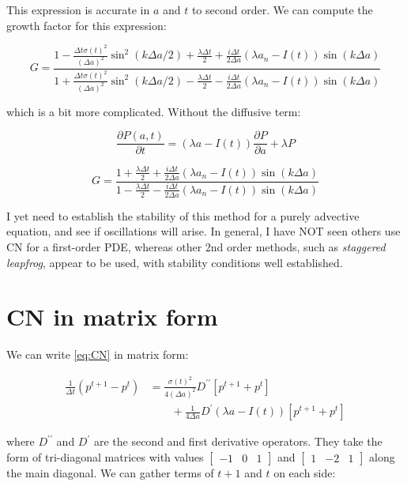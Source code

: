 \documentclass[12pt]{article}
\newcommand{\be}{\begin{equation}}
\newcommand{\ee}{\end{equation}}
\begin{document}
This expression is accurate in $a$ and $t$ to second order. We can compute the growth factor for this expression:

\be
G = \frac{1 - \frac{\Delta t \sigma(t)^2}{{(\Delta a)}^2}\sin^2(k\Delta a/2) + \frac{\lambda \Delta t}{2} + \frac{i \Delta t}{2 \Delta a}\left(\lambda a_n - I(t) \right) \sin \left(k \Delta a \right)}{1 + \frac{\Delta t \sigma(t)^2}{{(\Delta a)}^2}\sin^2(k\Delta a/2) - \frac{\lambda \Delta t}{2} - \frac{i \Delta t}{2 \Delta a}\left(\lambda a_n - I(t) \right) \sin\left(k\Delta a\right)}
\ee

which is a bit more complicated. Without the diffusive term:

\be
\frac{\partial P(a,t)}{\partial t} = (\lambda a -I(t)) \frac{\partial P}{\partial a} + \lambda P
\ee

\be
G = \frac{1 + \frac{\lambda \Delta t}{2} + \frac{i \Delta t}{2 \Delta a}\left(\lambda a_n - I(t) \right) \sin \left(k \Delta a \right)}{1 - \frac{\lambda \Delta t}{2} - \frac{i \Delta t}{2 \Delta a}\left(\lambda a_n - I(t) \right) \sin\left(k\Delta a\right)}
\ee

I yet need to establish the stability of this method for a purely advective equation, and see if oscillations will arise. In general, I have NOT seen others use CN for a first-order PDE, whereas other 2nd order methods, such as \emph{staggered leapfrog}, appear to be used, with stability conditions well established.

\section{CN in matrix form}

We can write \ref{eq:CN} in matrix form:

\begin{align}
	\frac{1}{\Delta t} \left(p^{t+1} - p^{t}\right) &= \frac{\sigma(t)^2}{4{{\left(\Delta a\right)}^2}} D^{\prime \prime} \left[ p^{t+1} + p^{t} \right]  \nonumber \\
	&\qquad {} + \frac{1}{4 \Delta a} D^{\prime}  \left(\lambda a - I(t) \right) \left[ p^{t+1} + p^{t} \right]	
\end{align}

where $D^{\prime \prime}$ and $D^{\prime}$ are the second and first derivative operators. They take the form of tri-diagonal matrices with values $\begin{bmatrix}-1 & 0 & 1 \end{bmatrix}$
 and $\begin{bmatrix}1 & -2 & 1 \end{bmatrix}$
 along the main diagonal. We can gather terms of $t+1$ and $t$ on each side:
 
\end{document}
